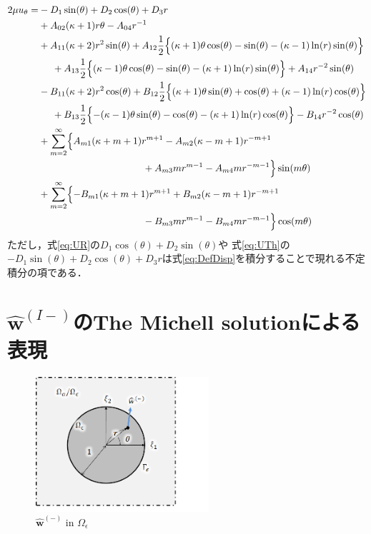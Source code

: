 \begin{align}
	2\mu u_{\theta} =&-D_{1}\sin(\theta)+D_{2}\cos(\theta)+D_{3}r
	\nonumber
	\\
	&+A_{02}(\kappa+1)r\theta
	-A_{04}r^{-1}
	\nonumber
	\\
	&+A_{11}(\kappa+2)r^2\sin(\theta)
	+A_{12}\frac{1}{2}\Bigl\{ (\kappa+1)\theta\cos(\theta) -\sin(\theta)-(\kappa-1)\ln(r)\sin(\theta) \Bigr\}
	\nonumber
	\\
	&\hspace{0.5cm}+A_{13}\frac{1}{2}\Bigl\{ (\kappa-1)\theta\cos(\theta) -\sin(\theta)-(\kappa+1)\ln(r)\sin(\theta) \Bigr\}
	+A_{14}r^{-2}\sin(\theta)
	\nonumber
	\\
	&-B_{11}(\kappa+2)r^2\cos(\theta)
	+B_{12}\frac{1}{2}\Bigl\{ (\kappa+1)\theta\sin(\theta) +\cos(\theta)+(\kappa-1)\ln(r)\cos(\theta) \Bigr\}
	\nonumber
	\\
	&\hspace{0.5cm}+B_{13}\frac{1}{2}\Bigl\{ -(\kappa-1)\theta\sin(\theta) -\cos(\theta)-(\kappa+1)\ln(r)\cos(\theta) \Bigr\}
	-B_{14}r^{-2}\cos(\theta)
	\nonumber
	\\
	&+\sum_{m=2}^{\infty}\Bigl\{A_{m1}(\kappa+m+1)r^{m+1}
	-A_{m2}(\kappa-m+1)r^{-m+1}
	\nonumber
	\\
	&\hspace{3.8cm}
	+A_{m3}mr^{m-1}
	-A_{m4}mr^{-m-1}\Bigr\}\sin(m\theta)
	\nonumber
	\\
	&+\sum_{m=2}^{\infty}\Bigl\{-B_{m1}(\kappa+m+1)r^{m+1}
	+B_{m2}(\kappa-m+1)r^{-m+1}
	\nonumber
	\\
	&\hspace{3.8cm}
	-B_{m3}mr^{m-1}
	-B_{m4}mr^{-m-1}\Bigr\}\cos(m\theta)
	\label{eq:UTh}
\end{align}
ただし，式\eqref{eq:UR}の$D_{1}\cos(\theta)+D_{2}\sin(\theta)$や
式\eqref{eq:UTh}の$-D_{1}\sin(\theta)+D_{2}\cos(\theta)+D_{3}r$は式\eqref{eq:DefDisp}を積分することで現れる不定積分の項である．
\newpage

\section{$\hat{\bm{w}}^{(I-)}$のThe Michell solutionによる表現}
\begin{figure}[ht]
	\begin{center}
		\includegraphics[height=5cm]{./figures/InHole.png}
		\caption{$\hat{\bm{w}}^{(-)}$ in $\Omega_{\epsilon}$}
		\label{fig:InHole}
	\end{center}
\end{figure}

